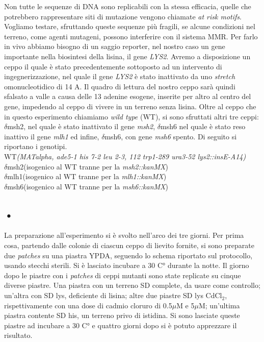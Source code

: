  Non tutte le sequenze di DNA sono replicabili con la stessa efficacia, quelle che potrebbero rappresentare siti di mutazione vengono chiamate \textit{at risk motifs}.  Vogliamo testare, sfruttando queste sequenze più fragili, se alcune condizioni nel terreno, come agenti mutageni, possono interferire con il sistema MMR. Per farlo in vivo abbiamo bisogno di un saggio reporter, nel nostro caso un gene importante nella biosintesi della lisina, il gene \textit{LYS2}. Avremo a disposizione un ceppo il quale è stato precedentemente sottoposto ad un intervento di ingegnerizzazione, nel quale il gene \textit{LYS2} è stato inattivato da uno \textit{stretch} omonucleotidico di 14 A. Il quadro di lettura del nostro ceppo sarà quindi sfalsato a valle a causa delle 13 adenine esogene, inserite per altro al centro del gene, impedendo al ceppo di vivere in un terreno senza lisina. Oltre al ceppo che in questo esperimento chiamiamo \textit{wild type} (WT), si sono sfruttati altri tre ceppi: $\delta$msh2, nel quale è stato inattivato il gene \textit{msh2}, $\delta$msh6 nel quale è stato reso inattivo il gene \textit{mlh1} ed infine, $\delta$msh6, con gene \textit{msh6} spento. Di seguito si riportano i genotipi. \\
WT\textit{(MATalpha, ade5-1 his 7-2 leu 2-3, 112 trp1-289 ura3-52 lys2::insE-A14)} \\
$\delta$msh2(isogenico al WT tranne per la \textit{msh2::kanMX}) \\
$\delta$mlh1(isogenico al WT tranne per la \textit{mlh1::kanMX}) \\
$\delta$msh6(isogenico al WT tranne per la \textit{msh6::kanMX})
 
 
 \subsection{•}
 La preparazione all'esperimento si è svolto nell'arco dei tre giorni. Per prima cosa, partendo dalle colonie di ciascun ceppo di lievito fornite, si sono preparate due \textit{patches} su una piastra YPDA, seguendo lo schema riportato sul protocollo, usando stecchi sterili. Si è lasciato incubare a 30 C° durante la notte. Il giorno dopo le piastre con i \textit{patches} di ceppi mutanti sono state replicate su cinque diverse piastre. Una piastra con un terreno SD complete, da usare come controllo; un'altra con SD lys, deficiente di lisina; altre due piastre SD lys CdCl$_{2}$, rispettivamente con una dose di cadmio cloruro di 0.5$\mu$M e 5$\mu$M; un'ultima piastra contente SD his, un terreno privo di istidina. Si sono lasciate queste piastre ad incubare a 30 C° e quattro giorni dopo si è potuto apprezzare il risultato.
 
